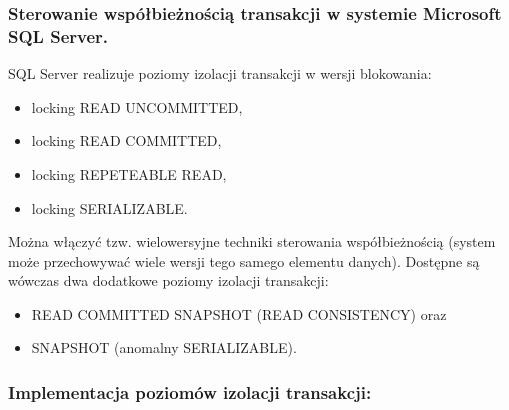 \documentclass[main.tex]{subfiles}
\begin{document}
    \subsubsection{Sterowanie współbieżnością transakcji w systemie Microsoft SQL Server.}
    SQL Server realizuje poziomy izolacji transakcji w wersji blokowania:
    \begin{itemize}
        \item locking READ UNCOMMITTED,
        \item locking READ COMMITTED,
        \item locking REPETEABLE READ,
        \item locking SERIALIZABLE.
    \end{itemize}

    Można włączyć tzw. wielowersyjne techniki sterowania współbieżnością (system może
    przechowywać wiele wersji tego samego elementu danych). Dostępne są wówczas dwa
    dodatkowe poziomy izolacji transakcji:
    \begin{itemize}
        \item READ COMMITTED SNAPSHOT (READ CONSISTENCY) oraz
        \item SNAPSHOT (anomalny SERIALIZABLE).
    \end{itemize}

    \subsubsection{Implementacja poziomów izolacji transakcji:}
\end{document}

